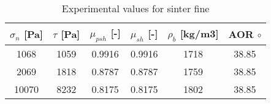 \begin{table}[h]
\centering
\begin{tabular}{cccccc}
$\sigma_n$ [Pa] & $\tau$ [Pa] & $\mu_{psh}$ [-] & $\mu_{sh}$ [-] &
$\rho_b$ [kg/m3] & AOR $\circ$ \\
\hline
    1068  & 1059  & 0.9916 & 0.9916 & 1718  & 38.85 \\
    2069  & 1818  & 0.8787 & 0.8787 & 1759  & 38.85 \\
    10070 & 8232  & 0.8175 & 0.8175 & 1802  & 38.85 \\

\hline
\end{tabular}
\caption{Experimental values for sinter fine}
\label{tab:05sinterTableExperimental}
\end{table}